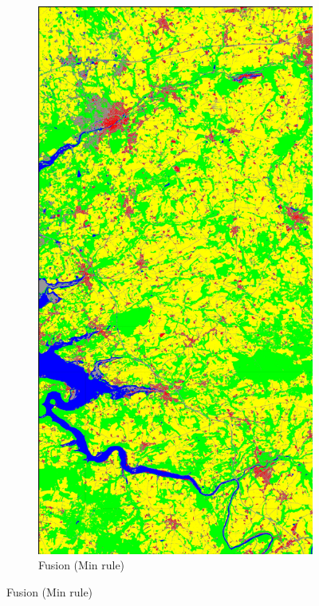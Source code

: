 \documentclass[10pt]{article}
\begin{document}
\begin{figure}[H]
    \centering 
    \begin{subfigure}{0.49\textwidth}
        \centering
        \includegraphics[width=\textwidth]{all_classif_Fusion_Min_weighted}
        \caption{Fusion (Min rule)}

\end{subfigure}
\end{figure}
\end{document}
